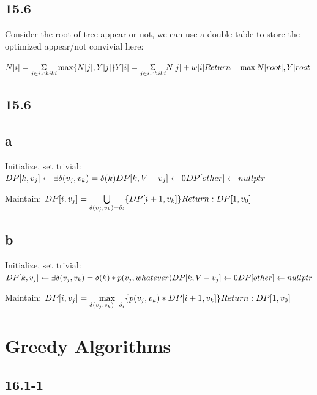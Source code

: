 \documentclass[]{article}
\begin{document}
\subsection{15.6}

Consider the root of tree appear or not, we can use a double table to store the optimized appear/not convivial here: 

$N[i] = \underset{j \in i.child}{\Sigma} \max\{N[j], Y[j]\}\\
 Y[i] = \underset{j \in i.child}{\Sigma} N[j] + w[i]\\
 Return \quad \max {N[root], Y[root]}$
 
\subsection{15.6}
\subsection{a}

Initialize, set trivial:
$DP[k, v_{j}] \leftarrow \exists \delta(v_{j}, v_{k}) = \delta(k)\\
DP[k, V-v_{j}] \leftarrow 0\\
DP[other] \leftarrow nullptr$

Maintain: 
$DP[i, v_{j}] = \underset{\delta(v_{j}, v_{k}) = \delta_{i}}{\bigcup} \{DP[i+1, v_{k}]\}\\
Return: DP[1, v_{0}]$

\subsection{b}

Initialize, set trivial:
$DP[k, v_{j}] \leftarrow \exists \delta(v_{j}, v_{k}) = \delta(k)*p(v_{j}, whatever)\\
DP[k, V-v_{j}] \leftarrow 0\\
DP[other] \leftarrow nullptr$

Maintain: 
$DP[i, v_{j}] = \underset{\delta(v_{j}, v_{k}) = \delta_{i}}{\max} \{p(v_{j}, v_{k}) * DP[i+1, v_{k}]\}\\
Return: DP[1, v_{0}]$


\section{Greedy Algorithms}
\subsection{16.1-1}
\end{document}
